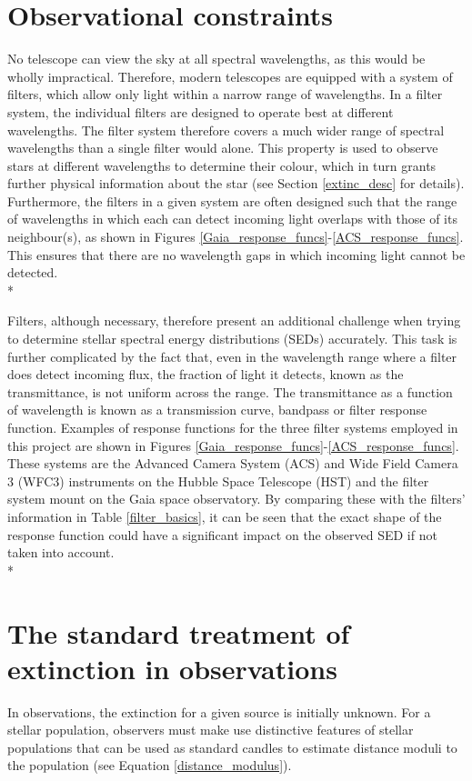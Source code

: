 \documentclass[12pt, a4paper]{report}
\begin{document}
\section{Observational constraints}
No telescope can view the sky at all spectral wavelengths, as this would be wholly impractical. Therefore, modern telescopes are equipped with a system of filters, which allow only light within a narrow range of wavelengths. In a filter system, the individual filters are designed to operate best at different wavelengths. The filter system therefore covers a much wider range of spectral wavelengths than a single filter would alone. This property is used to observe stars at different wavelengths to determine their colour, which in turn grants further physical information about the star (see Section \ref{extinc_desc} for details). Furthermore, the filters in a given system are often designed such that the range of wavelengths in which each can detect incoming light overlaps with those of its neighbour(s), as shown in Figures \ref{Gaia_response_funcs}-\ref{ACS_response_funcs}. This ensures that there are no wavelength gaps in which incoming light cannot be detected.\\*

Filters, although necessary, therefore present an additional challenge when trying to determine stellar spectral energy distributions (SEDs) accurately. This task is further complicated by the fact that, even in the wavelength range where a filter does detect incoming flux, the fraction of light it detects, known as the transmittance, is not uniform across the range. The transmittance as a function of wavelength is known as a transmission curve, bandpass or filter response function. Examples of response functions for the three filter systems employed in this project are shown in Figures \ref{Gaia_response_funcs}-\ref{ACS_response_funcs}. These systems are the Advanced Camera System (ACS) and Wide Field Camera 3 (WFC3) instruments on the Hubble Space Telescope (HST) and the filter system mount on the Gaia space observatory. By comparing these with the filters' information in Table \ref{filter_basics}, it can be seen that the exact shape of the response function could have a significant impact on the observed SED if not taken into account.\\*

\section{The standard treatment of extinction in observations}
In observations, the extinction for a given source is initially unknown. For a stellar population, observers must make use distinctive features of stellar populations that can be used as standard candles to estimate distance moduli to the population (see Equation \ref{distance_modulus}).
\end{document}
